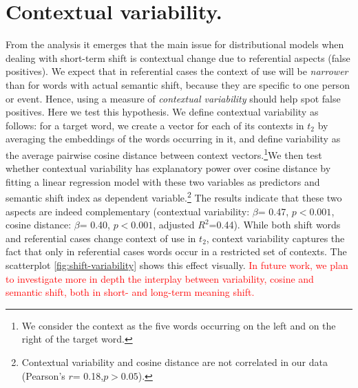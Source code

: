 \section{Contextual variability.}


From the analysis it emerges that the main issue for distributional models when dealing
with short-term shift is contextual change due to referential aspects (false positives).
We expect that in referential cases the context of use will be
\textit{narrower} than for words with actual semantic shift, because
they are specific to one person or event. Hence, using a measure of
\textit{contextual variability} should help spot false
positives.
Here we test this hypothesis. 
We define contextual variability as follows: for a target word, we create a vector for each of its contexts in $t_2$ by averaging the embeddings of the words  occurring in it, and define variability as the average pairwise cosine distance between context vectors.\footnote{We consider the context as the five words occurring on the left and on the right of the target word.}We then test whether contextual variability has explanatory power over cosine distance by fitting a linear regression model with these two variables as predictors and semantic shift index as dependent variable.\footnote{Contextual variability and cosine distance are not correlated in our data (Pearson's $r$= 0.18,$p> 0.05$). }
The results indicate that these two aspects are indeed complementary
(contextual variability: $\beta$= 0.47, $p< 0.001$, cosine distance:
$\beta$= 0.40, $p< 0.001$, adjusted $R^2$=0.44). While both shift
words and referential cases change context of use in $t_2$, context
variability captures the fact that only in referential cases words
occur in a restricted set of contexts. The scatterplot
\ref{fig:shift-variability} shows this effect visually.  \textcolor{red}{In future work, we plan to investigate more in depth the interplay between variability, cosine and semantic shift, both in short- and long-term meaning shift.}

